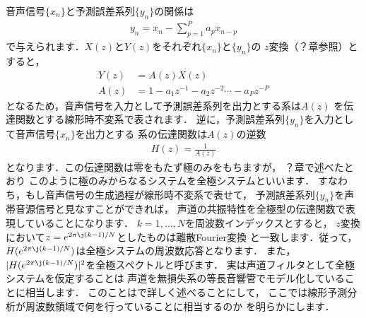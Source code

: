 音声信号$\{x_n\}$と予測誤差系列$\{y_n\}$の関係は
\begin{align}
y_n = x_n - \sum_{p=1}^{P} a_p x_{n-p}
\end{align}
で与えられます．$X(z)$と$Y(z)$をそれぞれ$\{x_n\}$と$\{y_n\}$の
$z$変換（？章参照）とすると，
\begin{align}
Y(z) &= A(z)X(z)\\
A(z) &= 1 - a_1 z^{-1} - a_2 z^{-2} \cdots - a_P z^{-P}
\end{align}
となるため，音声信号を入力として予測誤差系列を出力とする系は$A(z)$
を伝達関数とする線形時不変系で表されます．
逆に，予測誤差系列$\{y_n\}$を入力として音声信号$\{x_n\}$を出力とする
系の伝達関数は$A(z)$の逆数
\begin{align}
H(z) = \frac{1}{A(z)}
\end{align}
となります．この伝達関数は零をもたず極のみをもちますが，
？章で述べたとおり
このように極のみからなるシステムを全極システムといいます．
すなわち，もし音声信号の生成過程が線形時不変系で表せて，
予測誤差系列$\{y_n\}$を声帯音源信号と見なすことができれば，
声道の共振特性を全極型の伝達関数で表現していることになります．
$k=1,\ldots,N$を周波数インデックスとすると，
$z$変換において$z = e^{2\pi\j(k-1)/N}$としたものは離散Fourier変換
と一致します．従って，
$H(e^{2\pi\j(k-1)/N})$は全極システムの周波数応答となります．
また，$|H(e^{2\pi\j(k-1)/N})|^2$を全極スペクトルと呼びます．
実は声道フィルタとして全極システムを仮定することは
声道を無損失系の等長音響管でモデル化していることに相当します．
このことはで詳しく述べることにして，
ここでは線形予測分析が周波数領域で何を行っていることに相当するのか
を明らかにします．

